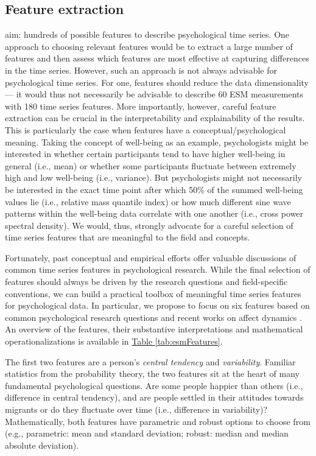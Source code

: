\documentclass[man, 12pt, a4paper]{apa7}
\theoremstyle{break}
\theoremstyle{plain}
\newcommand{\tblref}[2][]{\hyperref[#2]{Table \ref*{#2}#1}}
\begin{document}
\subsection{Feature extraction}
aim: 
hundreds of possible features to describe psychological time series. One approach to choosing relevant features would be to extract a large number of features and then assess which features are most effective at capturing differences in the time series. However, such an approach is not always advisable for psychological time series. For one, features should reduce the data dimensionality --- it would thus not necessarily be advisable to describe 60 ESM measurements with 180 time series features. More importantly, however, careful feature extraction can be crucial in the interpretability and explainability of the results. This is particularly the case when features have a conceptual/psychological meaning. Taking the concept of well-being as an example, psychologists might be interested in whether certain participants tend to have higher well-being in general (i.e., mean) or whether some participants fluctuate between extremely high and low well-being (i.e., variance). But psychologists might not necessarily be interested in the exact time point after which 50\% of the summed well-being values lie (i.e., relative mass quantile index) or how much different sine wave patterns within the well-being data correlate with one another (i.e., cross power spectral density). We would, thus, strongly advocate for a careful selection of time series features that are meaningful to the field and concepts.

Fortunately, past conceptual and empirical efforts offer valuable discussions of common time series features in psychological research. While the final selection of features should always be driven by the research questions and field-specific conventions, we can build a practical toolbox of meaningful time series features for psychological data. In particular, we propose to focus on six features based on common psychological research questions and recent works on affect dynamics \citep[e.g.,][]{dejonckheere2019, kuppens2017}. An overview of the features, their substantive interpretations and mathematical operationalizations is available in \tblref{tab:esmFeatures}.

The first two features are a person's \textit{central tendency} and \textit{variability}. Familiar statistics from the probability theory, the two features sit at the heart of many fundamental psychological questions. Are some people happier than others (i.e., difference in central tendency), and are people settled in their attitudes towards migrants or do they fluctuate over time (i.e., difference in variability)? Mathematically, both features have parametric and robust options to choose from (e.g., parametric: mean and standard deviation; robust: median and median absolute deviation). 
\end{document}
